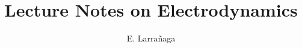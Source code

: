 \documentclass[10pt,letterpaper]{book}
\begin{document}
\title{Lecture Notes on Electrodynamics}
\author{E. Larra\~{n}aga}

\maketitle

\tableofcontents




\end{document}
